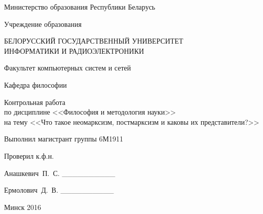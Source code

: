 \begin{titlepage}
\thispagestyle{empty}
\setlength{\parindent}{0cm} %

{\centering{}
  Министерство образования Республики Беларусь

  \smallskip
  Учреждение образования

  БЕЛОРУССКИЙ ГОСУДАРСТВЕННЫЙ УНИВЕРСИТЕТ \\
  ИНФОРМАТИКИ И РАДИОЭЛЕКТРОНИКИ

  \smallskip
  Факультет компьютерных систем и сетей

  \smallskip
  Кафедра философии \par
}

\vspace{50mm}

{\centering{}
  Контрольная работа \\
  по дисциплине <<Философия и методология науки>> \\
  на тему <<Что такое неомарксизм, постмарксизм и каковы их представители?>>\par
}

\vspace{60mm}

\begin{minipage}{.55\linewidth}
  Выполнил магистрант группы 6М1911

  \smallskip
  Проверил к.ф.н.
\end{minipage}
\hfill
\begin{minipage}{.4\linewidth}
  \begin{flushright}
    Анашкевич~П.~С. \_\_\_\_\_\_\_\_\_\_

    \smallskip
    Ермолович~Д.~В. \_\_\_\_\_\_\_\_\_\_
  \end{flushright}
\end{minipage}

\vfill
{\centering{}
  Минск 2016\par
}

\setlength{\parindent}{1.25cm} %
\end{titlepage}
